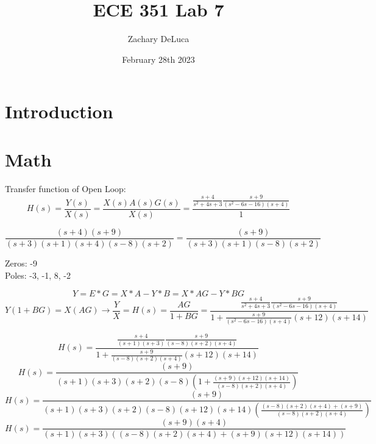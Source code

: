 \documentclass[12pt,a4paper]{article}
\title{ECE 351 Lab 7}
\author{Zachary DeLuca}
\date{February 28th 2023}
\begin{document}
	
\maketitle
\hline
\section{Introduction}
\section{Math}
Transfer function of Open Loop: 
$$H(s) = \frac{Y(s)}{X(s)}=\frac{X(s)A(s)G(s)}{X(s)}=\frac{\frac{s+4}{s^2+4s+3}\frac{s+9}{(s^2-6s-16)(s+4)}}{1}$$

$$\frac{(s+4)(s+9)}{(s+3)(s+1)(s+4)(s-8)(s+2)}=\frac{(s+9)}{(s+3)(s+1)(s-8)(s+2)}$$

Zeros: -9\\
Poles: -3, -1, 8, -2 \vspace{12pt}

$$Y = E*G=X*A-Y*B=X*AG-Y*BG$$
$$Y(1+BG)=X(AG)\rightarrow \frac{Y}{X}=H(s)=\frac{AG}{1+BG}=\frac{\frac{s+4}{s^2+4s+3}\frac{s+9}{(s^2-6s-16)(s+4)}}{1+\frac{s+9}{(s^2-6s-16)(s+4)}(s+12)(s+14)}$$

$$H(s)=\frac{\frac{s+4}{(s+1)(s+3)}\frac{s+9}{(s-8)(s+2)(s+4)}}{1+\frac{s+9}{(s-8)(s+2)(s+4)}(s+12)(s+14)}$$
$$H(s)=\frac{(s+9)}{(s+1)(s+3)(s+2)(s-8)(1+\frac{(s+9)(s+12)(s+14)}{(s-8)(s+2)(s+4)})}$$
$$H(s)=\frac{(s+9)}{(s+1)(s+3)(s+2)(s-8)(s+12)(s+14)(\frac{(s-8)(s+2)(s+4)+(s+9)}{(s-8)(s+2)(s+4)})}$$
$$H(s)=\frac{(s+9)(s+4)}{(s+1)(s+3)((s-8)(s+2)(s+4)+(s+9)(s+12)(s+14))}$$
\end{document}

